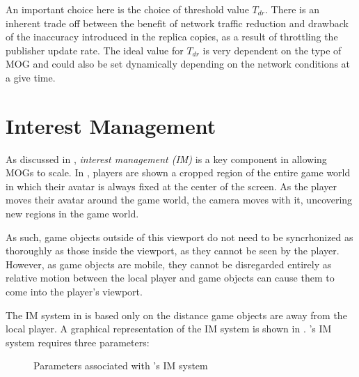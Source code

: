 An important choice here is the choice of threshold value $T_{dr}$. There is an inherent trade off between the benefit of network traffic reduction and drawback of the inaccuracy introduced in the replica copies, as a result of throttling the publisher update rate. The ideal value for $T_{dr}$ is very dependent on the type of MOG and could also be set dynamically depending on the network conditions at a give time.


\section{Interest Management}\label{sec:des:im}
As discussed in , \textit{interest management (IM)} is a key component in allowing MOGs to scale. In \game{}, players are shown a cropped region of the entire game world in which their avatar is always fixed at the center of the screen. As the player moves their avatar around the game world, the camera moves with it, uncovering new regions in the game world.

As such, game objects outside of this viewport do not need to be syncrhonized as thoroughly as those inside the viewport, as they cannot be seen by the player. However, as game objects are mobile, they cannot be disregarded entirely as relative motion between the local player and game objects can cause them to come into the player's viewport. 

The IM system in \game{} is based only on the distance game objects are away from the local player. A graphical representation of the IM system is shown in . \game{}'s IM system requires three parameters:

\begin{figure}[H]
    \centering
    \caption{Parameters associated with \game{}'s IM system}
    \label{fig:des:interest-regions}
\end{figure}

